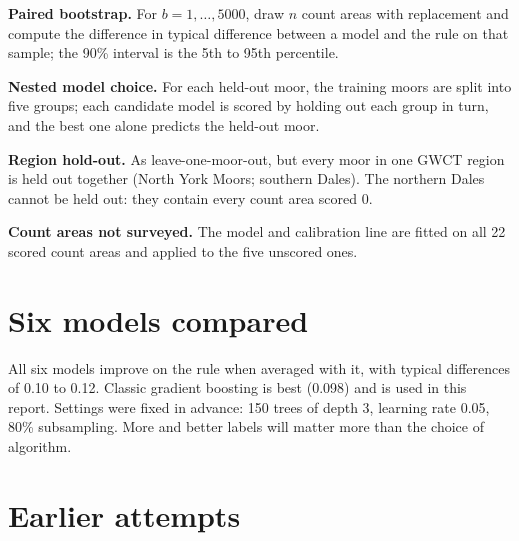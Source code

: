 \documentclass[11pt,a4paper]{article}
\begin{document}
\textbf{Paired bootstrap.} For $b = 1,\dots,5000$, draw $n$ count areas with replacement and compute the difference in typical difference between a model and the rule on that sample; the 90\% interval is the 5th to 95th percentile.

\textbf{Nested model choice.} For each held-out moor, the training moors are split into five groups; each candidate model is scored by holding out each group in turn, and the best one alone predicts the held-out moor.

\textbf{Region hold-out.} As leave-one-moor-out, but every moor in one GWCT region is held out together (North York Moors; southern Dales). The northern Dales cannot be held out: they contain every count area scored 0.

\textbf{Count areas not surveyed.} The model and calibration line are fitted on all 22 scored count areas and applied to the five unscored ones.

\clearpage
\section{Six models compared}\label{app:models}

\begin{table}[H]
\centering
\caption{Six models for Step 2, alone and averaged with the rule-based estimate. 22 count areas, leave-one-moor-out. The interval is the paired-bootstrap 90\% interval for the change in typical difference against the rule alone; negative is better.}\label{tab:models}
\scriptsize
\setlength{\tabcolsep}{3.5pt}

\end{table}

All six models improve on the rule when averaged with it, with typical differences of 0.10 to 0.12. Classic gradient boosting is best (0.098) and is used in this report. Settings were fixed in advance: 150 trees of depth 3, learning rate 0.05, 80\% subsampling. More and better labels will matter more than the choice of algorithm.

\section{Earlier attempts}\label{app:early}
\end{document}
